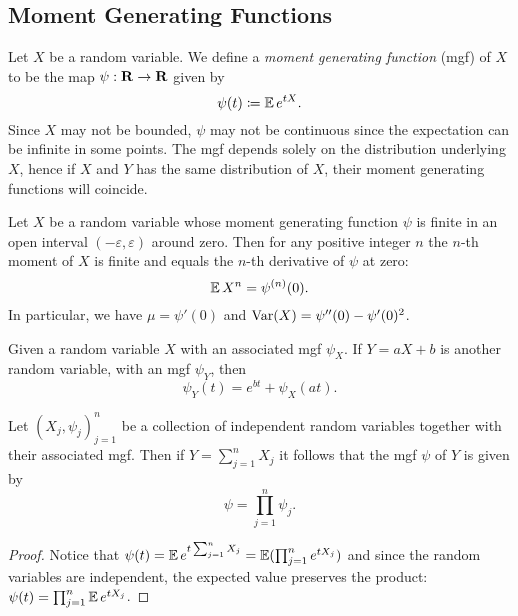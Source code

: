 \subsection{Moment Generating Functions}

\begin{definition}
    \label{def:moment-generating-function}
    Let \(X\) be a random variable. We define a \emph{moment generating function}
    (mgf) of \(X\) to be the map \(\psi: \mathbf{R} \to \mathbf{R}\) given by
    \[
        \psi(t) \coloneq \operatorname{\mathbb{E}} e^{t X}.
    \]
    Since \(X\) may not be bounded, \(\psi\) may not be continuous since the
    expectation can be infinite in some points. The mgf depends solely on the
    distribution underlying \(X\), hence if \(X\) and \(Y\) has the same
    distribution of \(X\), their moment generating functions will coincide.
\end{definition}

\begin{proposition}
    \label{prop:moment-and-mgf}
    Let \(X\) be a random variable whose moment generating function \(\psi\) is finite
    in an open interval \((-\varepsilon, \varepsilon)\) around zero. Then for any positive integer
    \(n\) the \(n\)-th moment of \(X\) is finite and equals the \(n\)-th derivative
    of \(\psi\) at zero:
    \[
        \operatorname{\mathbb{E}} X^n = \psi^{(n)}(0).
    \]
    In particular, we have \(\mu = \psi'(0)\) and \(\operatorname{Var}(X) = \psi''(0) - \psi'(0)^2\).
\end{proposition}

\begin{proposition}
    \label{prop:mgf-linear-combination}
    Given a random variable \(X\) with an associated mgf \(\psi_X\). If \(Y = a X + b\)
    is another random variable, with an mgf \(\psi_Y\), then
    \[
        \psi_Y(t) = e^{b t} + \psi_X(a t).
    \]
\end{proposition}

\begin{proposition}
    \label{prop:mgf-sum-random-variables}
    Let \((X_j, \psi_j)_{j=1}^n\) be a collection of independent random variables
    together with their associated mgf. Then if \(Y = \sum_{j=1}^n X_j\) it follows
    that the mgf \(\psi\) of \(Y\) is given by
    \[
        \psi = \prod_{j=1}^n \psi_j.
    \]
\end{proposition}

\begin{proof}
    Notice that
    \(\psi(t) = \operatorname{\mathbb{E}} e^{t\sum_{j=1}^n X_j} = \operatorname{\mathbb{E}}(\prod_{j=1}^n e^{t X_j})\) and since
    the random variables are independent, the expected value preserves the product:
    \(\psi(t) = \prod_{j=1}^n \operatorname{\mathbb{E}} e^{t X_j}\).
\end{proof}

